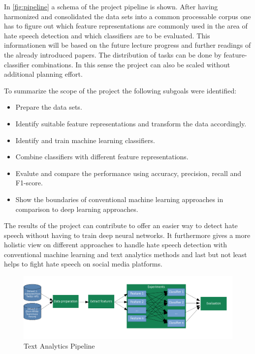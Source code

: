 In \autoref{fig:pipeline} a schema of the project pipeline is shown. After having harmonized and consolidated the data sets into a common processable corpus one has to figure out which feature representations are commonly used in the area of hate speech detection and which classifiers are to be evaluated. This informationen will be based on the future lecture progress and further readings of the already introduced papers. The distribution of tasks can be done by feature-classifier combinations. In this sense the project can also be scaled without additional planning effort.  

\vspace{12pt}
To summarize the scope of the project the following subgoals were iden\-ti\-fied:

\begin{itemize}
	\item Prepare the data sets.
	\item Identify suitable feature representations and transform the data ac\-cord\-ingly.
	\item Identify and train machine learning classifiers.
	\item Combine classifiers with different feature representations.
	\item Evalute and compare the performance using accuracy, precision, recall and F1-score.
	\item Show the boundaries of conventional machine learning approaches in comparison to deep learning approaches.
\end{itemize}

The results of the project can contribute to offer an easier way to detect hate speech without having to train deep neural networks. It furthermore gives a more holistic view on different approaches to handle hate speech detection with conventional machine learning and text analytics methods and last but not least helps to fight hate speech on social media platforms.

\begin{figure}[t]
	\centering
	\includegraphics[width=1.0\textwidth]{./pipeline.png}	
	\caption{Text Analytics Pipeline}
	\label{fig:pipeline}
\end{figure}
